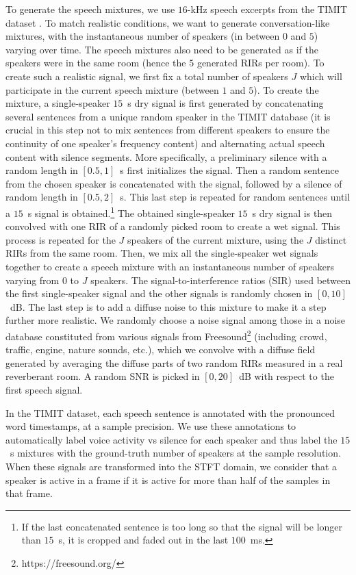 To generate the speech mixtures, we use $16$-kHz speech excerpts from the TIMIT dataset \cite{garofolo_timit_1993}. To match realistic conditions, we want to generate conversation-like mixtures, with the instantaneous number of speakers (in between $0$ and $5$) varying over time. The speech mixtures also need to be generated as if the speakers were in the same room (hence the $5$ generated RIRs per room). To create such a realistic signal, we first fix a total number of speakers $J$ which will participate in the current speech mixture (between $1$ and $5$). To create the mixture, a single-speaker $15$~s dry signal is first generated by concatenating several sentences from a unique random speaker in the TIMIT database (it is crucial in this step not to mix sentences from different speakers to ensure the continuity of one speaker's frequency content) and alternating actual speech content with silence segments. More specifically, a preliminary silence with a random length in $[0.5,1]$~s first initializes the signal. Then a random sentence from the chosen speaker is concatenated with the signal, followed by a silence of random length in $[0.5,2]$~s. This last step is repeated for random sentences until a $15$~s signal is obtained.\footnote{If the last concatenated sentence is too long so that the signal will be longer than $15$~s, it is cropped and faded out in the last $100$~ms.} The obtained single-speaker $15$~s dry signal is then convolved with one RIR of a randomly picked room to create a wet signal. This process is repeated for the $J$ speakers of the current mixture, using the $J$ distinct RIRs from the same room. Then, we mix all the single-speaker wet signals together to create a speech mixture with an instantaneous number of speakers varying from $0$ to $J$ speakers. The signal-to-interference ratios (SIR) used between the first single-speaker signal and the other signals is randomly chosen in $[0,10]$~dB. The last step is to add a diffuse noise to this mixture to make it a step further more realistic. We randomly choose a noise signal among those in a noise database constituted from various signals from Freesound\footnote{https://freesound.org/} (including crowd, traffic, engine, nature sounds, etc.), which we convolve with a diffuse field generated by averaging the diffuse parts of two random RIRs measured in a real reverberant room. A random SNR is picked in $[0,20]$~dB with respect to the first speech signal.

In the TIMIT dataset, each speech sentence is annotated with the pronounced word timestamps, at a sample precision. We use these annotations to automatically label voice activity vs silence for each speaker and thus label the $15$~s mixtures with the ground-truth number of speakers at the sample resolution. When these signals are transformed into the STFT domain, we consider that a speaker is active in a frame if it is active for more than half of the samples in that frame.

